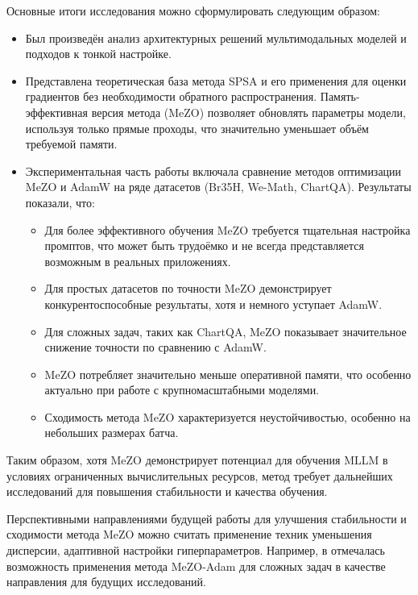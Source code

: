 \documentclass[LI,KR]{HSEUniversity}
\begin{document}
Основные итоги исследования можно сформулировать следующим образом:

\begin{itemize}
    \item Был произведён анализ архитектурных решений мультимодальных моделей и подходов к тонкой настройке.

    \item Представлена теоретическая база метода SPSA и его применения для оценки градиентов без необходимости обратного распространения.
Память-эффективная версия метода (MeZO) позволяет обновлять параметры модели, используя только прямые проходы, что значительно уменьшает объём требуемой памяти.

    \item Экспериментальная часть работы включала сравнение методов оптимизации MeZO и AdamW на ряде датасетов (Br35H, We-Math, ChartQA). Результаты показали, что:
    \begin{itemize}
        \item Для более эффективного обучения MeZO требуется тщательная настройка промптов, что может быть трудоёмко и не всегда представляется возможным в реальных приложениях.
        \item Для простых датасетов по точности MeZO демонстрирует конкурентоспособные результаты, хотя и немного уступает AdamW.
        \item Для сложных задач, таких как ChartQA, MeZO показывает значительное снижение точности по сравнению с AdamW. %
        \item MeZO потребляет значительно меньше оперативной памяти, что особенно актуально при работе с крупномасштабными моделями.
        \item Сходимость метода MeZO характеризуется неустойчивостью, особенно на небольших размерах батча.
    \end{itemize}
\end{itemize}

Таким образом, хотя MeZO демонстрирует потенциал для обучения MLLM в условиях ограниченных вычислительных ресурсов,
метод требует дальнейших исследований для повышения стабильности и качества обучения.

Перспективными направлениями будущей работы для улучшения стабильности и сходимости метода MeZO
можно считать применение техник уменьшения дисперсии, адаптивной настройки гиперпараметров.
Например, в \cite{mezo} отмечалась возможность применения метода MeZO-Adam для сложных задач в качестве направления для будущих исследований.
\end{document}
